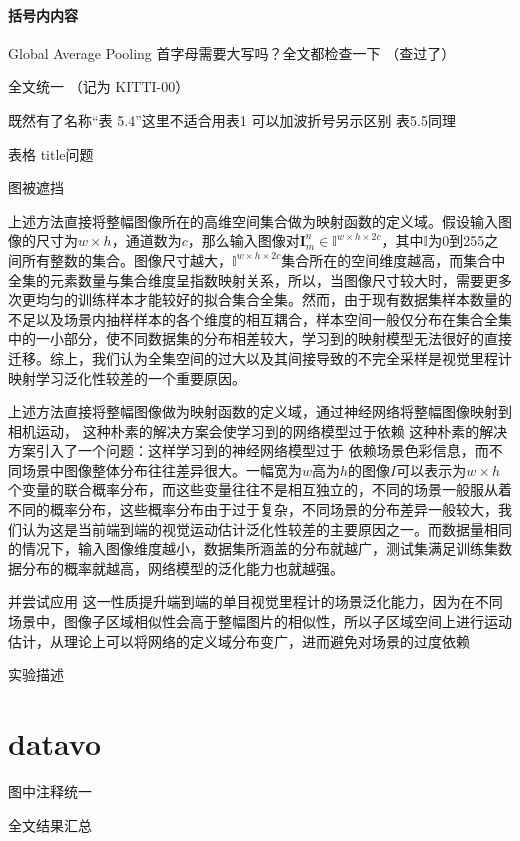 \paragraph{括号内内容}
Global Average Pooling 
首字母需要大写吗？全文都检查一下 （查过了）

全文统一
（记为 KITTI-00）

既然有了名称“表 5.4”这里不适合用表1 
可以加波折号另示区别 
表5.5同理

表格 title问题

图被遮挡

上述方法直接将整幅图像所在的高维空间集合做为映射函数的定义域。假设输入图像的尺寸为$w\times h$，通道数为$c$，那么输入图像对$\mathbf{I}_m^n \in \mathbb{I}^{w\times h\times 2c}$，其中$\mathbb{I}$为0到255之间所有整数的集合。图像尺寸越大，$\mathbb{I}^{w\times h\times 2c}$集合所在的空间维度越高，而集合中全集的元素数量与集合维度呈指数映射关系，所以，当图像尺寸较大时，需要更多次更均匀的训练样本才能较好的拟合集合全集。然而，由于现有数据集样本数量的不足以及场景内抽样样本的各个维度的相互耦合，样本空间一般仅分布在集合全集中的一小部分，使不同数据集的分布相差较大，学习到的映射模型无法很好的直接迁移。综上，我们认为全集空间的过大以及其间接导致的不完全采样是视觉里程计映射学习泛化性较差的一个重要原因。

上述方法直接将整幅图像做为映射函数的定义域，通过神经网络将整幅图像映射到相机运动，
这种朴素的解决方案会使学习到的网络模型过于依赖
这种朴素的解决方案引入了一个问题：这样学习到的神经网络模型过于
依赖场景色彩信息，而不同场景中图像整体分布往往差异很大。一幅宽为$w$高为$h$的图像$I$可以表示为$w\times h$个变量的联合概率分布，而这些变量往往不是相互独立的，不同的场景一般服从着不同的概率分布，这些概率分布由于过于复杂，不同场景的分布差异一般较大，我们认为这是当前端到端的视觉运动估计泛化性较差的主要原因之一。而数据量相同的情况下，输入图像维度越小，数据集所涵盖的分布就越广，测试集满足训练集数据分布的概率就越高，网络模型的泛化能力也就越强。



并尝试应用
这一性质提升端到端的单目视觉里程计的场景泛化能力，因为在不同场景中，图像子区域相似性会高于整幅图片的相似性，所以子区域空间上进行运动估计，从理论上可以将网络的定义域分布变广，进而避免对场景的过度依赖

实验描述

\section{datavo}
图中注释统一

全文结果汇总